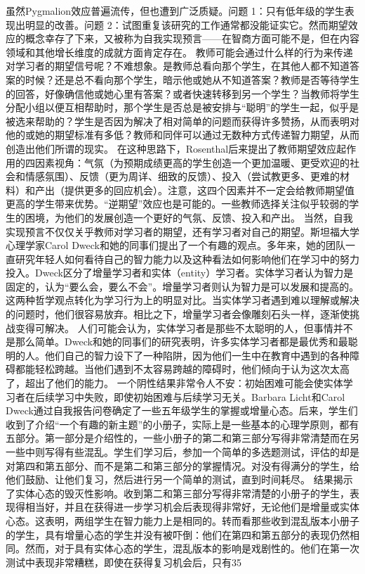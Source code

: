 虽然Pygmalion效应普遍流传，但也遭到广泛质疑。问题 1：只有低年级的学生表现出明显的改善。问题 2：试图重复该研究的工作通常都没能证实它。然而期望效应的概念幸存了下来，又被称为自我实现预言——在智商方面可能不是，但在内容领域和其他增长维度的成就方面肯定存在。
教师可能会通过什么样的行为来传递对学习者的期望信号呢？不难想象。是教师总看向那个学生，在其他人都不知道答案的时候？还是总不看向那个学生，暗示他或她从不知道答案？教师是否等待学生的回答，好像确信他或她心里有答案？或者快速转移到另一个学生？当教师将学生分配小组以便互相帮助时，那个学生是否总是被安排与“聪明”的学生一起，似乎是被选来帮助的？学生是否因为解决了相对简单的问题而获得许多赞扬，从而表明对他的或她的期望标准有多低？教师和同伴可以通过无数种方式传递智力期望，从而创造出他们所谓的现实。
在这种思路下，Rosenthal后来提出了教师期望效应起作用的四因素视角：气氛（为预期成绩更高的学生创造一个更加温暖、更受欢迎的社会和情感氛围）、反馈（更为周详、细致的反馈）、投入（尝试教更多、更难的材料）和产出（提供更多的回应机会）。注意，这四个因素并不一定会给教师期望值更高的学生带来优势。“逆期望”效应也是可能的。一些教师选择关注似乎较弱的学生的困境，为他们的发展创造一个更好的气氛、反馈、投入和产出。
当然，自我实现预言不仅仅关乎教师对学习者的期望，还有学习者对自己的期望。斯坦福大学心理学家Carol Dweck和她的同事们提出了一个有趣的观点。多年来，她的团队一直研究年轻人如何看待自己的智力能力以及这种看法如何影响他们在学习中的努力投入。Dweck区分了增量学习者和实体（entity）学习者。实体学习者认为智力是固定的，认为“要么会，要么不会”。增量学习者则认为智力是可以发展和提高的。这两种哲学观点转化为学习行为上的明显对比。当实体学习者遇到难以理解或解决的问题时，他们很容易放弃。相比之下，增量学习者会像雕刻石头一样，逐渐使挑战变得可解决。
人们可能会认为，实体学习者是那些不太聪明的人，但事情并不是那么简单。Dweck和她的同事们的研究表明，许多实体学习者都是最优秀和最聪明的人。他们自己的智力设下了一种陷阱，因为他们一生中在教育中遇到的各种障碍都能轻松跨越。当他们遇到不太容易跨越的障碍时，他们倾向于认为这次太高了，超出了他们的能力。
一个阴性结果非常令人不安：初始困难可能会使实体学习者在后续学习中失败，即使初始困难与后续学习无关。Barbara Licht和Carol Dweck通过自我报告问卷确定了一些五年级学生的掌握或增量心态。后来，学生们收到了介绍“一个有趣的新主题”的小册子，实际上是一些基本的心理学原则，都有五部分。第一部分是介绍性的，一些小册子的第二和第三部分写得非常清楚而在另一些中则写得有些混乱。学生们学习后，参加一个简单的多选题测试，评估的却是对第四和第五部分、而不是第二和第三部分的掌握情况。对没有得满分的学生，给他们鼓励、让他们复习，然后进行另一个简单的测试，直到时间耗尽。
结果揭示了实体心态的毁灭性影响。收到第二和第三部分写得非常清楚的小册子的学生，表现得相当好，并且在获得进一步学习机会后表现得非常好，无论他们是增量或实体心态。这表明，两组学生在智力能力上是相同的。转而看那些收到混乱版本小册子的学生，具有增量心态的学生并没有被吓倒：他们在第四和第五部分的表现仍然相同。然而，对于具有实体心态的学生，混乱版本的影响是戏剧性的。他们在第一次测试中表现非常糟糕，即使在获得复习机会后，只有35%
